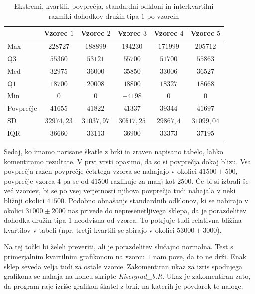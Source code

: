 \documentclass[a4paper, 10pt]{article}
\begin{document}
	\begin{table}[h!]
		\label{tab: QuartMeanA}
		\centering
		\begin{tabular}{|l|c|c|c|c|c|}
			\hline
			 & Vzorec $1$ & Vzorec $2$ & Vzorec $3$ & Vzorec $4$ & Vzorec $5$ \\ \hline
			Max & $228727$ & $188899$ & $194230$ & $171999$ & $205712$ \\ \hline
			Q$3$ & $55360$ & $53121$ & $55700$ & $51700$ & $55863$ \\ \hline
			Med & $32975$ & $36000$ & $35850$ & $33006$ & $36527$ \\ \hline
			Q$1$ & $18700$ & $20008$ & $18800$ & $18327$ & $18668$ \\ \hline
			Min & $0$ & $0$ & $-4198$ & $0$ & $0$ \\ \hline
			\hline
			Povprečje & $41655$ & $41822$ & $41337$ & $39344$ & $41697$ \\ \hline
			SD & $32974{,}23$ & $31037{,}97$ & $30517{,}25$ & $29867{,}4$ & $31099{,}04$ \\ \hline
			IQR & $36660$ & $33113$ & $36900$ & $33373$ & $37195$ \\ \hline
		\end{tabular}
		\caption{Ekstremi, kvartili, povprečja, standardni odkloni in interkvartilni razmiki dohodkov družin tipa $1$ po vzorcih}
	\end{table}
	
	Sedaj, ko imamo narisane škatle z brki in zraven napisano tabelo, lahko komentiramo rezultate. V prvi vrsti opazimo, da so si povprečja dokaj blizu. Vsa povprečja razen povprečje četrtega vzorca se nahajajo v okolici $41500 \pm 500$, povprečje vzorca $4$ pa se od $41500$ razlikuje za manj kot $2500$. Če bi si izbrali še već vzorcev, bi se po vsej verjetnosti njihova povprečja tudi nahajala v neki bližnji okolici $41500$. Podobno obnašanje standardnih odklonov, ki se nabirajo v okolici $31000 \pm 2000$ nas privede do nepresenetljivega sklepa, da je porazdelitev dohodka družin tipa $1$ neodvisna od vzorca. To potrjuje tudi relativna bližina kvartilov v tabeli (npr. tretji kvartili se zbirajo v okolici $53000 \pm 3000$).
	
	Na tej točki bi želeli preveriti, ali je porazdelitev slučajno normalna. Test s primerjalnim kvartilnim grafikonom na vzorcu $1$ nam pove, da to ne drži. Enak sklep seveda velja tudi za ostale vzorce. Zakomentiran ukaz za izris spodnjega grafikona se nahaja na koncu skripte \textit{Kibergrad\_b.R}. Ukaz je zakomentiran zato, da program raje izriše grafikon škatel z brki, na katerih je povdarek te naloge.
	
\end{document}
